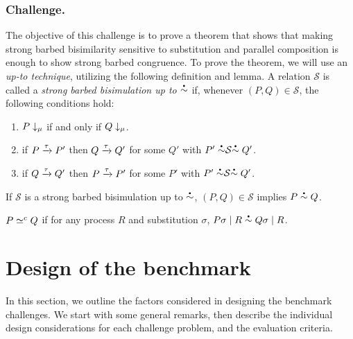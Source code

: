 \documentclass[runningheads]{llncs}
\begin{document}
\subsubsection{Challenge.}
The objective of this challenge is to prove a theorem that shows that
making strong barbed bisimilarity sensitive to substitution and
parallel composition is enough to show strong barbed
congruence.
To prove the theorem, we will use an \emph{up-to technique}, utilizing the following definition and lemma.
A relation \( \mathcal{S} \) is called a \emph{strong barbed bisimulation up to \( \sbbisim{}{} \)} if, whenever \( (P,Q) \in \mathcal{S} \), the following conditions hold:
\begin{enumerate}
\item \( P\downarrow_{\mu} \) if and only if \( Q\downarrow_{\mu} \).
\item if \( P \xrightarrow{\tau} P' \) then \( Q \xrightarrow{\tau} Q' \) for some \( Q' \) with \( \uptosbb{P'}{\mathcal{S}}{Q'} \).
\item if \( Q \xrightarrow{\tau} Q' \) then \( P \xrightarrow{\tau} P' \) for some \( P' \) with \( \uptosbb{P'}{\mathcal{S}}{Q'} \).
\end{enumerate}
\begin{lemma}\label{lemma:up-to}
  If \( \mathcal{S} \) is a strong barbed bisimulation up to \( \sbbisim{}{} \), \( (P,Q) \in \mathcal{S} \) implies \( \sbbisim{P}{Q} \).
\end{lemma}

\begin{theorem}
  \( P \simeq^c Q \) if for any process \( R \) and
  substitution \( \sigma \),
  \(
  \sbbisim{\Ppar{\applysubst{\sigma}{P}}{R}}{\Ppar{\applysubst{\sigma}{Q}}{R}}
  \).
\end{theorem}

\section{Design of the benchmark}\label{sec:design-discussion}

In this section, we outline the factors considered in designing the
benchmark challenges. We start with some general remarks, then
describe the individual design considerations for each challenge problem,
and the evaluation criteria.
\end{document}
